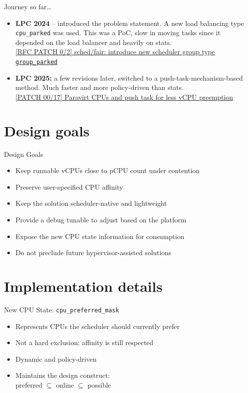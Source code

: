 \documentclass[xetex, table, 10pt,%
aspectratio=169%
]{beamer}
\begin{document}
\begin{frame}{Journey so far\ldots}
\begin{itemize}
  \item \textbf{LPC 2024} -- introduced the problem statement. A new
    load balancing type \texttt{cpu\_parked} was used. This was a
    PoC, slow in moving tasks since it depended on the load balancer
    and heavily on stats.\\
    {\small\href{https://lore.kernel.org/all/20241204112149.25872-1-huschle@linux.ibm.com/\#r}{[RFC
    PATCH 0/2] sched/fair: introduce new scheduler group type
    \texttt{group\_parked}}}
  \item \textbf{LPC 2025:} a few revisions later, switched to a
    push-task-mechanism-based method. Much faster and more
    policy-driven than stats.\\
    {\small\href{https://lore.kernel.org/all/20251119124449.1149616-1-sshegde@linux.ibm.com/\#r}{[PATCH
    00/17] Paravirt CPUs and push task for less vCPU preemption}}
\end{itemize}
\end{frame}

\section{Design goals}

\begin{frame}{Design Goals}
\begin{itemize}
  \item Keep runnable vCPUs close to pCPU count under contention
  \item Preserve user-specified CPU affinity
  \item Keep the solution scheduler-native and lightweight
  \item Provide a debug tunable to adjust based on the platform
  \item Expose the new CPU state information for consumption
  \item Do not preclude future hypervisor-assisted solutions
\end{itemize}
\end{frame}

\section{Implementation details}

\begin{frame}{New CPU State: \texttt{cpu\_preferred\_mask}}
\begin{itemize}
  \item Represents CPUs the scheduler should currently prefer
  \item Not a hard exclusion: affinity is still respected
  \item Dynamic and policy-driven
  \item Maintains the design construct:\\
    preferred $\subseteq$ online $\subseteq$ possible
\end{itemize}
\end{frame}
\end{document}
